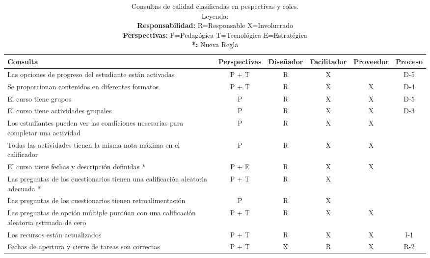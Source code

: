 \begin{center}
    \centering
    \label{tabla:2}
    \begin{longtable}{p{3cm} c c c c c}
            \caption{Consultas de calidad clasificadas en pespectivas y roles.\\
                Leyenda:\\
                \textbf{Responsabilidad:} R=Responsable X=Involucrado\\
                \textbf{Perspectivas:} P=Pedagógica T=Tecnológica E=Estratégica \\
                \textbf{*:} Nueva Regla
            }\\
        \hline
        Consulta & Perspectivas & Diseñador & Facilitador & Proveedor & Proceso\\
        \endhead
        \hline
        Las opciones de progreso del estudiante están activadas & P + T & R & X & & D-5 \\
        \hline
        Se proporcionan contenidos en diferentes formatos & P + T & R  & X & X & D-4\\
        \hline
        El curso tiene grupos & P & R & X & X & D-5 \\
        \hline
        El curso tiene actividades grupales & P & R & X & X & D-3 \\
        \hline
        Los estudiantes pueden ver las condiciones necesarias para completar una actividad & P & R & X & X & \\
        \hline
        Todas las actividades tienen la misma nota máxima en el calificador & P & R & X & X & \\
        \hline
        El curso tiene fechas y descripción definidas * & P + E & R & X & X & \\
        \hline
        Las preguntas de los cuestionarios tienen una calificación aleatoria adecuada * & P + T  & R & X &  & \\
        \hline        
        Las preguntas de los cuestionarios tienen retroalimentación & P & R & X &  & \\
        \hline
        Las preguntas de opción múltiple puntúan con una calificación aleatoria estimada de cero & P + T & R & X & X & \\
        \hline
        Los recursos están actualizados & P + T & R & X & X & I-1 \\
        \hline
        Fechas de apertura y cierre de tareas son correctas & P + T & X & R & X & R-2 \\

\end{longtable}
\end{center}
